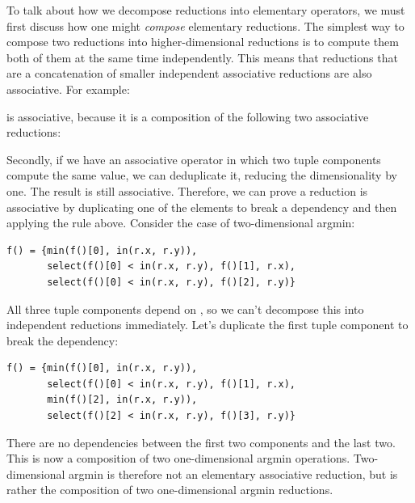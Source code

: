 To talk about how we decompose reductions into elementary operators, we must first discuss how one might \emph{compose} elementary reductions. The simplest way to compose two reductions into higher-dimensional reductions is to compute them both of them at the same time independently. This means that reductions that are a concatenation of smaller independent associative reductions are also associative. For example:


is associative, because it is a composition of the following two associative reductions:



Secondly, if we have an associative operator in which two tuple components compute the same value, we can deduplicate it, reducing the dimensionality by one. The result is still associative. Therefore, we can prove a reduction is associative by duplicating one of the elements to break a dependency and then applying the rule above. Consider the case of two-dimensional argmin:

\begin{lstlisting}[caption={Two-dimensional argmin. The three tuple components are the minimum value, and its x and y coordinates.}]
f() = {min(f()[0], in(r.x, r.y)),
       select(f()[0] < in(r.x, r.y), f()[1], r.x),
       select(f()[0] < in(r.x, r.y), f()[2], r.y)}
\end{lstlisting}

All three tuple components depend on , so we can't decompose this into independent reductions immediately. Let's duplicate the first tuple component to break the dependency:

\begin{lstlisting}[caption={Two-dimensional argmin with the minimum value redundantly computed as \code{f()[0]} and \code{f()[2]}}]
f() = {min(f()[0], in(r.x, r.y)),
       select(f()[0] < in(r.x, r.y), f()[1], r.x),
       min(f()[2], in(r.x, r.y)),
       select(f()[2] < in(r.x, r.y), f()[3], r.y)}
\end{lstlisting}

There are no dependencies between the first two components and the last two. This is now a composition of two one-dimensional argmin operations. Two-dimensional argmin is therefore not an elementary associative reduction, but is rather the composition of two one-dimensional argmin reductions.


